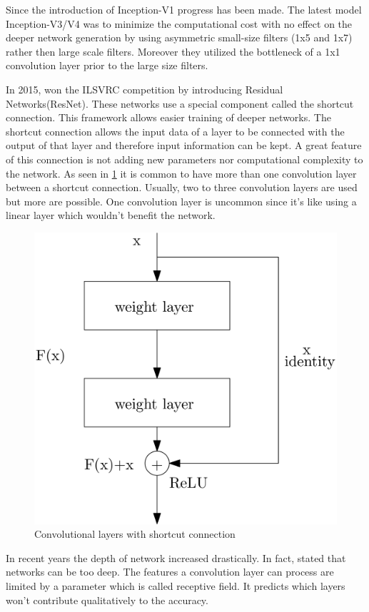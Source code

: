 \documentclass[
a4paper, 
12pt,
grayscalebody, %
abstract=on,
twoside, BCOR10mm, 12pt, DIV13,headinclude, footexclude, final, abstracton, openright
]{ibireprt}
\numberwithin{equation}{chapter}
\numberwithin{table}{chapter}
\numberwithin{figure}{chapter}
\numberwithin{algorithm}{chapter}
\numberwithin{example}{chapter}
\numberwithin{example}{chapter}
\begin{document}
Since the introduction of Inception-V1 progress has been made. The latest model Inception-V3/V4 was to minimize the computational cost with no effect on the deeper network generation by using asymmetric small-size filters (1x5 and 1x7) rather then large scale filters. Moreover they utilized the bottleneck of a 1x1 convolution layer prior to the large size filters. 

In 2015,\cite{He2016a} won the ILSVRC competition by introducing Residual Networks(ResNet). These networks use a special component called the shortcut connection. This framework allows easier training of deeper networks. The shortcut connection allows the input data of a layer to be connected with the output of that layer and therefore input information can be kept. A great feature of this connection is not adding new parameters nor computational complexity to the network. As seen in \ref{fig:ResNet_block} it is common to have more than one convolution layer between a shortcut connection. Usually, two to three convolution layers are used but more are possible. One convolution layer is uncommon since it's like using a linear layer which wouldn't benefit the network.


\begin{figure}[h]	
	\center
	\includegraphics[width = 0.4 \textwidth]{conv_layer_with_skip_connection.png}%
	\caption{Convolutional layers with shortcut connection}
	\label{fig:ResNet_block}
\end{figure}%

In recent years the depth of network increased drastically. In fact, \cite{Richter2021} stated that networks can be too deep. The features a convolution layer can process are limited by a parameter which is called receptive field. It predicts which layers won't contribute qualitatively to the accuracy.
\end{document}
